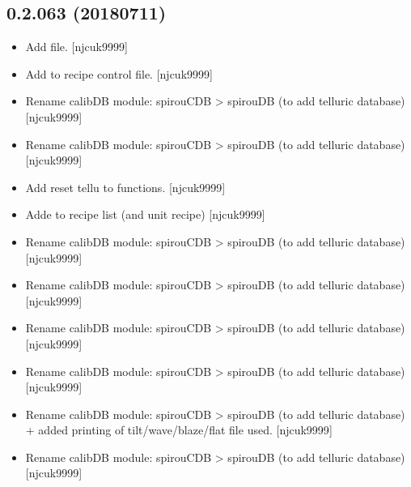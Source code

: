 \documentclass[a4paper,10pt,english]{report}
\begin{document}
\subsection{0.2.063 (2018\sphinxhyphen{}07\sphinxhyphen{}11)}
\label{\detokenize{misc/changelog:id416}}\begin{itemize}
\item {} 
Add  file. {[}njcuk9999{]}

\item {} 
Add  to recipe control file. {[}njcuk9999{]}

\item {} 
Rename calibDB module: spirouCDB \textendash{}\textgreater{} spirouDB (to add telluric
database) {[}njcuk9999{]}

\item {} 
Rename calibDB module: spirouCDB \textendash{}\textgreater{} spirouDB (to add telluric
database) {[}njcuk9999{]}

\item {} 
Add reset tellu to  functions. {[}njcuk9999{]}

\item {} 
Adde  to recipe list (and unit recipe) {[}njcuk9999{]}

\item {} 
Rename calibDB module: spirouCDB \textendash{}\textgreater{} spirouDB (to add telluric
database) {[}njcuk9999{]}

\item {} 
Rename calibDB module: spirouCDB \textendash{}\textgreater{} spirouDB (to add telluric
database) {[}njcuk9999{]}

\item {} 
Rename calibDB module: spirouCDB \textendash{}\textgreater{} spirouDB (to add telluric
database) {[}njcuk9999{]}

\item {} 
Rename calibDB module: spirouCDB \textendash{}\textgreater{} spirouDB (to add telluric
database) {[}njcuk9999{]}

\item {} 
Rename calibDB module: spirouCDB \textendash{}\textgreater{} spirouDB (to add telluric
database) + added printing of tilt/wave/blaze/flat file used.
{[}njcuk9999{]}

\item {} 
Rename calibDB module: spirouCDB \textendash{}\textgreater{} spirouDB (to add telluric
database) {[}njcuk9999{]}


\end{itemize}
\end{document}
